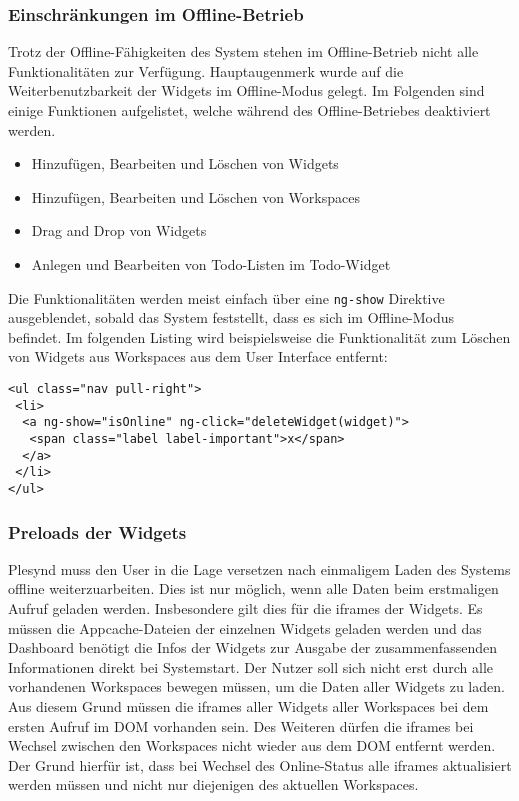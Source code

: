 \subsubsection*{Einschränkungen im Offline-Betrieb}
Trotz der Offline-Fähigkeiten des System stehen im Offline-Betrieb nicht alle Funktionalitäten zur Verfügung. Hauptaugenmerk wurde auf die Weiterbenutzbarkeit der Widgets im Offline-Modus gelegt. Im Folgenden sind einige Funktionen aufgelistet, welche während des Offline-Betriebes deaktiviert werden.
\begin{itemize}
 \item Hinzufügen, Bearbeiten und Löschen von Widgets
 \item Hinzufügen, Bearbeiten und Löschen von Workspaces
 \item Drag and Drop von Widgets
 \item Anlegen und Bearbeiten von Todo-Listen im Todo-Widget
\end{itemize}
 Die Funktionalitäten werden meist einfach über eine \texttt{ng-show} Direktive ausgeblendet, sobald das System feststellt, dass es sich im Offline-Modus befindet. Im folgenden Listing wird beispielsweise die Funktionalität zum Löschen von Widgets aus Workspaces aus dem User Interface entfernt:
\begin{lstlisting}
<ul class="nav pull-right">
 <li>
  <a ng-show="isOnline" ng-click="deleteWidget(widget)">
   <span class="label label-important">x</span>
  </a>
 </li>
</ul>
\end{lstlisting}

\subsubsection*{Preloads der Widgets}
Plesynd muss den User in die Lage versetzen nach einmaligem Laden des Systems offline weiterzuarbeiten. Dies ist nur möglich, wenn alle Daten beim erstmaligen Aufruf geladen werden. Insbesondere gilt dies für die iframes der Widgets. Es müssen die Appcache-Dateien der einzelnen Widgets geladen werden und das Dashboard benötigt die Infos der Widgets zur Ausgabe der zusammenfassenden Informationen direkt bei Systemstart. Der Nutzer soll sich nicht erst durch alle vorhandenen Workspaces bewegen müssen, um die Daten aller Widgets zu laden. Aus diesem Grund müssen die iframes aller Widgets aller Workspaces bei dem ersten Aufruf im DOM vorhanden sein. Des Weiteren dürfen die iframes bei Wechsel zwischen den Workspaces nicht wieder aus dem DOM entfernt werden. Der Grund hierfür ist, dass bei Wechsel des Online-Status alle iframes aktualisiert werden müssen und nicht nur diejenigen des aktuellen Workspaces.

